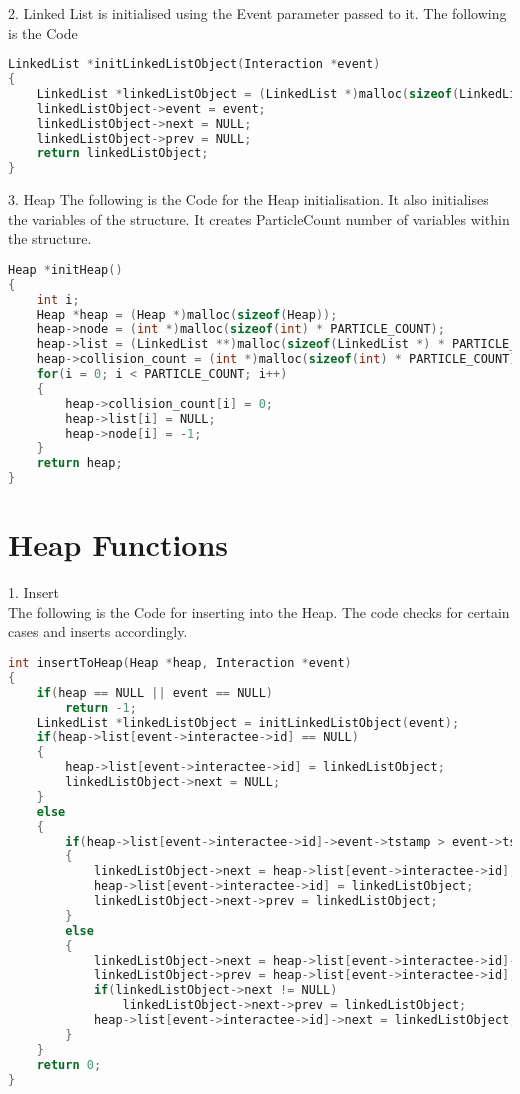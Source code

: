 \documentclass{article}
\begin{document}
2. Linked List is initialised using the Event parameter passed to it.
The following is the Code
\begin{lstlisting}[language=c, caption=Right]
LinkedList *initLinkedListObject(Interaction *event)
{
    LinkedList *linkedListObject = (LinkedList *)malloc(sizeof(LinkedList));
    linkedListObject->event = event;
    linkedListObject->next = NULL;
    linkedListObject->prev = NULL;
    return linkedListObject;
}
\end{lstlisting}

3. Heap
The following is the Code for the Heap initialisation. It also initialises the variables of the structure. It creates ParticleCount number of variables within the structure.
\begin{lstlisting}[language=c, caption=Right]
Heap *initHeap()
{
    int i;
    Heap *heap = (Heap *)malloc(sizeof(Heap));
    heap->node = (int *)malloc(sizeof(int) * PARTICLE_COUNT);
    heap->list = (LinkedList **)malloc(sizeof(LinkedList *) * PARTICLE_COUNT);
    heap->collision_count = (int *)malloc(sizeof(int) * PARTICLE_COUNT);
    for(i = 0; i < PARTICLE_COUNT; i++)
    {
        heap->collision_count[i] = 0;
        heap->list[i] = NULL;
        heap->node[i] = -1;
    }
    return heap;
}
\end{lstlisting}

\section{Heap Functions}

1. Insert \\
The following is the Code for inserting into the Heap. The code checks for certain cases and inserts accordingly.
\begin{lstlisting}[language=c, caption=delete]
int insertToHeap(Heap *heap, Interaction *event)
{
    if(heap == NULL || event == NULL)
        return -1;
    LinkedList *linkedListObject = initLinkedListObject(event);
    if(heap->list[event->interactee->id] == NULL)
    {
        heap->list[event->interactee->id] = linkedListObject;
        linkedListObject->next = NULL;
    }
    else
    {
        if(heap->list[event->interactee->id]->event->tstamp > event->tstamp)
        {
            linkedListObject->next = heap->list[event->interactee->id];
            heap->list[event->interactee->id] = linkedListObject;
            linkedListObject->next->prev = linkedListObject;
        }
        else
        {
            linkedListObject->next = heap->list[event->interactee->id]->next;
            linkedListObject->prev = heap->list[event->interactee->id];
            if(linkedListObject->next != NULL)
                linkedListObject->next->prev = linkedListObject;
            heap->list[event->interactee->id]->next = linkedListObject;   
        }
    }
    return 0;
}
\end{lstlisting}
\end{document}
